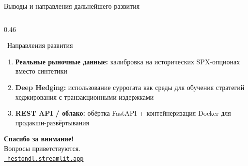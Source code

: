 \documentclass[aspectratio=169, 10pt]{beamer}
\begin{document}
\begin{frame}{Выводы и направления дальнейшего развития}
\begin{columns}[T]
\begin{column}{0.46\textwidth}
\begin{alertblock}{\faArrowRight\ Направления развития}
\begin{enumerate}
          \item \textbf{Реальные рыночные данные:}
                калибровка на исторических SPX-опционах
                вместо синтетики

          \item \textbf{Deep Hedging:}
                использование суррогата как среды
                для обучения стратегий хеджирования
                с транзакционными издержками

          \item \textbf{REST API / облако:}
                обёртка FastAPI + контейнеризация Docker
                для продакшн-развёртывания
        \end{enumerate}
      \end{alertblock}

      \vspace{0.5em}
      \begin{center}
        {\large\bfseries\color{hestonblue} Спасибо за внимание!}\\[0.5em]
        {\small\color{gray}
          Вопросы приветствуются.\\[0.3em]
          \href{https://hestondl.streamlit.app/}%
               {\faGlobe\ \texttt{hestondl.streamlit.app}}}
      \end{center}
    \end{column}

  \end{columns}
\end{frame}
\end{document}
